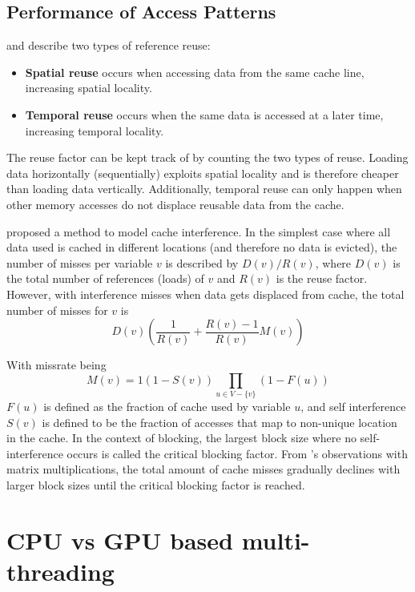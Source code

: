 \subsection{Performance of Access Patterns}
\citeauthor{lam1991cache} and \citeauthor{meyer2003algorithms} describe two types of reference reuse\cite{lam1991cache, meyer2003algorithms}:
\begin{itemize}
    \item \textbf{Spatial reuse} occurs when accessing data from the same cache line, increasing spatial locality.
    \item \textbf{Temporal reuse} occurs when the same data is accessed at a later time, increasing temporal locality.
\end{itemize}
The reuse factor can be kept track of by counting the two types of reuse.
Loading data horizontally (sequentially) exploits spatial locality and is therefore cheaper than loading data vertically.
Additionally, temporal reuse can only happen when other memory accesses do not displace reusable data from the cache.

\citeauthor{lam1991cache} proposed a method to model cache interference.
In the simplest case where all data used is cached in different locations (and therefore no data is evicted), the number of misses per variable $v$ is described by $D(v)/R(v)$, where $D(v)$ is the total number of references (loads) of $v$ and $R(v)$ is the reuse factor.
However, with interference misses when data gets displaced from cache, the total number of misses for $v$ is
\[
    D(v)\left(\frac{1}{R(v)}+\frac{R(v)-1}{R(v)}M(v)\right)
\]

With missrate being
\[
    M(v) = 1 \left(1 - S(v)\right) \prod_{u\in V - \{v\}}\left(1 - F(u)\right)
\]
$F(u)$ is defined as the fraction of cache used by variable $u$, and self interference $S(v)$ is defined to be the fraction of accesses that map to non-unique location in the cache.
In the context of blocking, the largest block size where no self-interference occurs is called the critical blocking factor.
From \citeauthor{lam1991cache}'s observations with matrix multiplications, the total amount of cache misses gradually declines with larger block sizes until the critical blocking factor is reached.



\section{CPU vs GPU based multi-threading}

